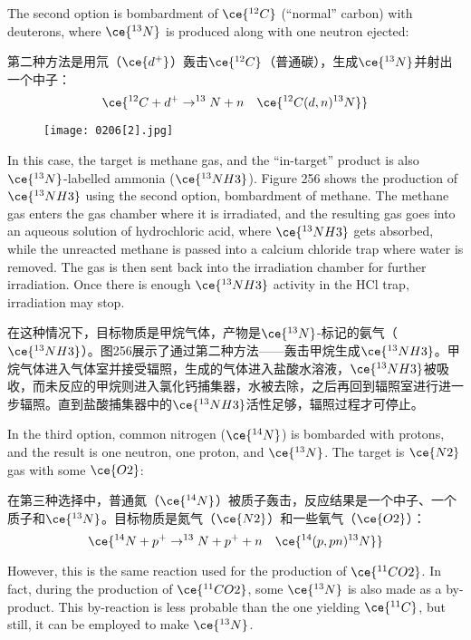 \documentclass[dvipsnames, svgnames,a4paper,11pt]{article}
\begin{document}
The second option is bombardment of \(\ce{^{12}C}\) (“normal” carbon) with deuterons, where \(\ce{^{13}N}\) is produced along with one neutron ejected:

第二种方法是用氘（\(\ce{d^+}\)）轰击\(\ce{^{12}C}\)（普通碳），生成\(\ce{^{13}N}\)并射出一个中子：
\[
\ce{^{12}C + d^+ \rightarrow ^{13}N + n \quad \ce{^{12}C(d,n)^{13}N}}
\]

\begin{figure}[h]
	\centering
    \texttt{[image: 0206[2].jpg]}  
     \label{fig256}
\end{figure}

In this case, the target is methane gas, and the “in-target” product is also \(\ce{^{13}N}\)-labelled ammonia (\(\ce{^{13}NH3}\)). Figure 256 shows the production of \(\ce{^{13}NH3}\) using the second option, bombardment of methane. The methane gas enters the gas chamber where it is irradiated, and the resulting gas goes into an aqueous solution of hydrochloric acid, where \(\ce{^{13}NH3}\) gets absorbed, while the unreacted methane is passed into a calcium chloride trap where water is removed. The gas is then sent back into the irradiation chamber for further irradiation. Once there is enough \(\ce{^{13}NH3}\) activity in the HCl trap, irradiation may stop.  

在这种情况下，目标物质是甲烷气体，产物是\(\ce{^{13}N}\)-标记的氨气（\(\ce{^{13}NH3}\)）。图256展示了通过第二种方法——轰击甲烷生成\(\ce{^{13}NH3}\)。甲烷气体进入气体室并接受辐照，生成的气体进入盐酸水溶液，\(\ce{^{13}NH3}\)被吸收，而未反应的甲烷则进入氯化钙捕集器，水被去除，之后再回到辐照室进行进一步辐照。直到盐酸捕集器中的\(\ce{^{13}NH3}\)活性足够，辐照过程才可停止。  

In the third option, common nitrogen (\(\ce{^{14}N}\)) is bombarded with protons, and the result is one neutron, one proton, and \(\ce{^{13}N}\). The target is \(\ce{N2}\) gas with some \(\ce{O2}\):

在第三种选择中，普通氮（\(\ce{^{14}N}\)）被质子轰击，反应结果是一个中子、一个质子和\(\ce{^{13}N}\)。目标物质是氮气（\(\ce{N2}\)）和一些氧气（\(\ce{O2}\)）：
\[
\ce{^{14}N + p^+ \rightarrow ^{13}N + p^+ + n \quad \ce{^{14}(p,pn)^{13}N}}
\]

However, this is the same reaction used for the production of \(\ce{^{11}CO2}\). In fact, during the production of \(\ce{^{11}CO2}\), some \(\ce{^{13}N}\) is also made as a by-product. This by-reaction is less probable than the one yielding \(\ce{^{11}C}\), but still, it can be employed to make \(\ce{^{13}N}\).
\end{document}

